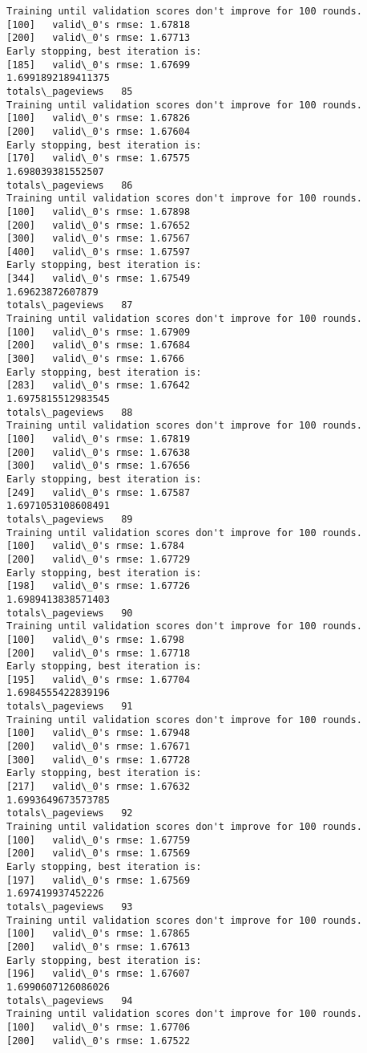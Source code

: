 \documentclass[11pt]{article}
\begin{document}
\begin{Verbatim}[commandchars=\\\{\}]
Training until validation scores don't improve for 100 rounds.
[100]	valid\_0's rmse: 1.67818
[200]	valid\_0's rmse: 1.67713
Early stopping, best iteration is:
[185]	valid\_0's rmse: 1.67699
1.6991892189411375
totals\_pageviews   85
Training until validation scores don't improve for 100 rounds.
[100]	valid\_0's rmse: 1.67826
[200]	valid\_0's rmse: 1.67604
Early stopping, best iteration is:
[170]	valid\_0's rmse: 1.67575
1.698039381552507
totals\_pageviews   86
Training until validation scores don't improve for 100 rounds.
[100]	valid\_0's rmse: 1.67898
[200]	valid\_0's rmse: 1.67652
[300]	valid\_0's rmse: 1.67567
[400]	valid\_0's rmse: 1.67597
Early stopping, best iteration is:
[344]	valid\_0's rmse: 1.67549
1.69623872607879
totals\_pageviews   87
Training until validation scores don't improve for 100 rounds.
[100]	valid\_0's rmse: 1.67909
[200]	valid\_0's rmse: 1.67684
[300]	valid\_0's rmse: 1.6766
Early stopping, best iteration is:
[283]	valid\_0's rmse: 1.67642
1.6975815512983545
totals\_pageviews   88
Training until validation scores don't improve for 100 rounds.
[100]	valid\_0's rmse: 1.67819
[200]	valid\_0's rmse: 1.67638
[300]	valid\_0's rmse: 1.67656
Early stopping, best iteration is:
[249]	valid\_0's rmse: 1.67587
1.6971053108608491
totals\_pageviews   89
Training until validation scores don't improve for 100 rounds.
[100]	valid\_0's rmse: 1.6784
[200]	valid\_0's rmse: 1.67729
Early stopping, best iteration is:
[198]	valid\_0's rmse: 1.67726
1.6989413838571403
totals\_pageviews   90
Training until validation scores don't improve for 100 rounds.
[100]	valid\_0's rmse: 1.6798
[200]	valid\_0's rmse: 1.67718
Early stopping, best iteration is:
[195]	valid\_0's rmse: 1.67704
1.6984555422839196
totals\_pageviews   91
Training until validation scores don't improve for 100 rounds.
[100]	valid\_0's rmse: 1.67948
[200]	valid\_0's rmse: 1.67671
[300]	valid\_0's rmse: 1.67728
Early stopping, best iteration is:
[217]	valid\_0's rmse: 1.67632
1.6993649673573785
totals\_pageviews   92
Training until validation scores don't improve for 100 rounds.
[100]	valid\_0's rmse: 1.67759
[200]	valid\_0's rmse: 1.67569
Early stopping, best iteration is:
[197]	valid\_0's rmse: 1.67569
1.697419937452226
totals\_pageviews   93
Training until validation scores don't improve for 100 rounds.
[100]	valid\_0's rmse: 1.67865
[200]	valid\_0's rmse: 1.67613
Early stopping, best iteration is:
[196]	valid\_0's rmse: 1.67607
1.6990607126086026
totals\_pageviews   94
Training until validation scores don't improve for 100 rounds.
[100]	valid\_0's rmse: 1.67706
[200]	valid\_0's rmse: 1.67522

\end{Verbatim}
\end{document}
